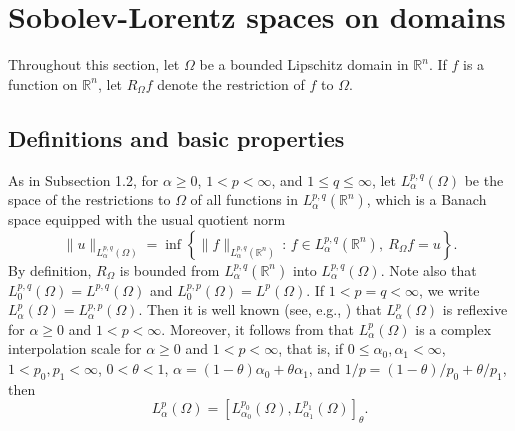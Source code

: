 \documentclass[reqno,centertags,11pt]{amsart}
\theoremstyle{definition}
\numberwithin{thm}{section}
\numberwithin{equation}{section}
\newcommand{\R}{{\mathbb{R}}}
\begin{document}
\section{Sobolev-Lorentz spaces on  domains}

Throughout this section, let $\Omega$ be a  bounded Lipschitz domain in $\R^n$. If $f$ is a function on $\R^n$, let $R_\Omega f$ denote the restriction of $f$ to $\Omega$.


\subsection{Definitions and basic properties}


As in Subsection 1.2, for $\alpha  \ge  0$, $1< p<\infty$, and $1 \le q \le \infty$, let
$L_\alpha^{p,q}(\Omega )$ be the space of the   restrictions to $\Omega$ of all functions in $L_\alpha^{p,q}(\R^n )$,
which is a Banach space equipped with the usual quotient  norm
\[
\|u\|_{L_\alpha^{p,q}(\Omega )} = \inf \left\{ \|f\|_{L_\alpha^{p,q}(\R^n )}  \,:\, f\in L_\alpha^{p,q}(\R^n ),\ R_\Omega f = u \right\}.
\]
By definition,  $R_\Omega$ is bounded   from $L_\alpha^{p,q}(\R^n )$ into $L_\alpha^{p,q}(\Omega )$. Note also  that    $L_0^{p,q}(\Omega ) = L^{p,q}(\Omega )$ and    $L_0^{p,p} (\Omega )= L^p (\Omega )$. If $1< p=q <\infty$,  we write $L_\alpha^{p }(\Omega )=L_\alpha^{p,p}(\Omega )$. Then it is well known (see, e.g.,  \cite[p.329]{FMM}) that $L_\alpha^{p }(\Omega )$ is   reflexive for $\alpha \ge  0$ and $1<p<\infty$. Moreover,   it follows from     \cite[Proposition  2.4]{JK}   that $L_\alpha^{p }(\Omega )$   is a   complex interpolation scale  for $\alpha \ge  0$ and $1<p<\infty$, that is, if $0 \le      \alpha_0 , \alpha_1 < \infty$,  $1<     p_0 , p_1 < \infty$, $0<\theta < 1$,
$\alpha =(1-\theta )\alpha_0 +\theta\alpha_1$, and $1/p =(1-\theta )/p_0 +\theta/p_1$, then
\begin{equation}\label{complex interp for S}
L_{\alpha}^{p} (\Omega )  = \left[ L_{\alpha_0}^{p_0} (\Omega ) ,L_{\alpha_1}^{p_1} (\Omega ) \right]_{\theta}  .
\end{equation}
\end{document}
